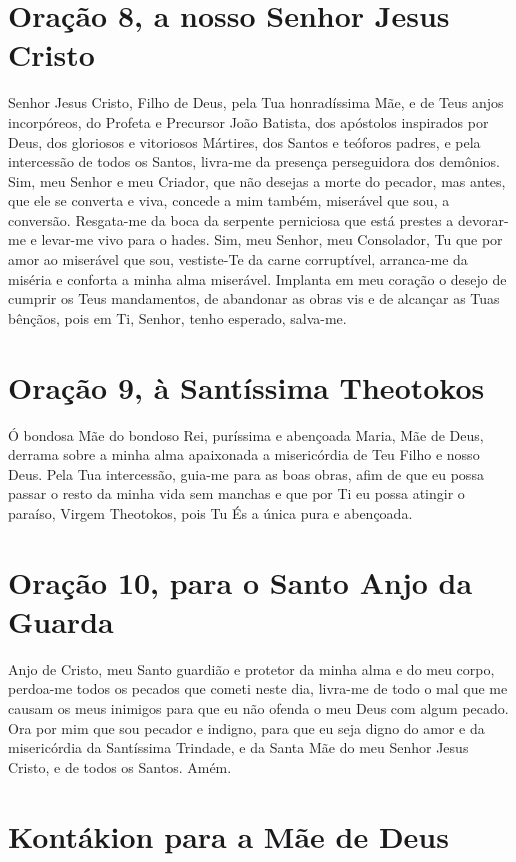 \documentclass{subfiles}
\begin{document}
\section*{Oração 8, a nosso Senhor Jesus Cristo}

Senhor Jesus Cristo, Filho de Deus, pela Tua honradíssima Mãe, e de Teus anjos
incorpóreos, do Profeta e Precursor João Batista, dos apóstolos inspirados por
Deus, dos gloriosos e vitoriosos Mártires, dos Santos e teóforos padres, e pela
intercessão de todos os Santos, livra-me da presença perseguidora dos demônios.
Sim, meu Senhor e meu Criador, que não desejas a morte do pecador, mas antes,
que ele se converta e viva, concede a mim também, miserável que sou, a
conversão. Resgata-me da boca da serpente perniciosa que está prestes a
devorar-me e levar-me vivo para o hades. Sim, meu Senhor, meu Consolador, Tu que
por amor ao miserável que sou, vestiste-Te da carne corruptível, arranca-me da
miséria e conforta a minha alma miserável. Implanta em meu coração o desejo de
cumprir os Teus mandamentos, de abandonar as obras vis e de alcançar as Tuas
bênçãos, pois em Ti, Senhor, tenho esperado, salva-me.
 
\section*{Oração 9, à Santíssima Theotokos}

Ó bondosa Mãe do bondoso Rei, puríssima e abençoada Maria, Mãe
de Deus, derrama sobre a minha alma apaixonada a misericórdia de Teu Filho
e nosso Deus. Pela Tua intercessão, guia-me para as boas obras, afim de que
eu possa passar o resto da minha vida sem manchas e que por Ti eu possa
atingir o paraíso, Virgem Theotokos, pois Tu És a única pura e abençoada.

\section*{Oração 10, para o Santo Anjo da Guarda}

Anjo de Cristo, meu Santo guardião e protetor da minha alma e do meu
corpo, perdoa-me todos os pecados que cometi neste dia, livra-me de todo o
mal que me causam os meus inimigos para que eu não ofenda o meu Deus
com algum pecado. Ora por mim que sou pecador e indigno, para que eu seja
digno do amor e da misericórdia da Santíssima Trindade, e da Santa Mãe do
meu Senhor Jesus Cristo, e de todos os Santos. Amém.


\section*{Kontákion para a Mãe de Deus}
\end{document}
